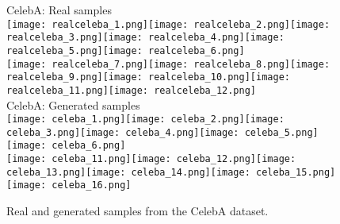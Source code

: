 \begin{figure}
	\centering
	CelebA: Real samples\\
	\texttt{[image: realceleba\_1.png]}\hspace{5px}\texttt{[image: realceleba\_2.png]}\hspace{5px}\texttt{[image: realceleba\_3.png]}\hspace{5px}\texttt{[image: realceleba\_4.png]}\hspace{5px}\texttt{[image: realceleba\_5.png]}\hspace{5px}\texttt{[image: realceleba\_6.png]}\\
	\vspace{0.1cm}
	\texttt{[image: realceleba\_7.png]}\hspace{5px}\texttt{[image: realceleba\_8.png]}\hspace{5px}\texttt{[image: realceleba\_9.png]}\hspace{5px}\texttt{[image: realceleba\_10.png]}\hspace{5px}\texttt{[image: realceleba\_11.png]}\hspace{5px}\texttt{[image: realceleba\_12.png]}\\
		
	CelebA: Generated samples\\
	\texttt{[image: celeba\_1.png]}\hspace{5px}\texttt{[image: celeba\_2.png]}\hspace{5px}\texttt{[image: celeba\_3.png]}\hspace{5px}\texttt{[image: celeba\_4.png]}\hspace{5px}\texttt{[image: celeba\_5.png]}\hspace{5px}\texttt{[image: celeba\_6.png]}\\
	\vspace{0.1cm}
	\texttt{[image: celeba\_11.png]}\hspace{5px}\texttt{[image: celeba\_12.png]}\hspace{5px}\texttt{[image: celeba\_13.png]}\hspace{5px}\texttt{[image: celeba\_14.png]}\hspace{5px}\texttt{[image: celeba\_15.png]}\hspace{5px}\texttt{[image: celeba\_16.png]}\\
	
	\caption{Real and generated samples from the CelebA dataset.}
	\label{fig:samples_celeba}
\end{figure}
